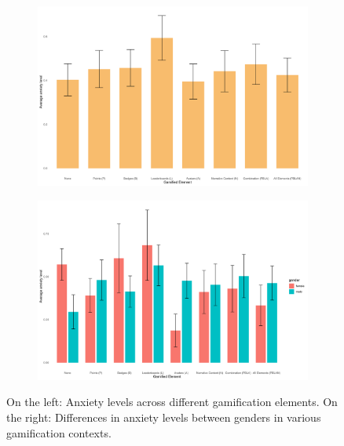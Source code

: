 \begin{figure}[h]
    \centering
    \begin{subfigure}[b]{0.45\textwidth}
        \includegraphics[width=\textwidth]{img/plots/plot_anxiety.png}
        \label{fig:plot_anxiety}
    \end{subfigure}
    \hfill
    \begin{subfigure}[b]{0.45\textwidth}
        \includegraphics[width=\textwidth]{img/plots/plot_anxiety_gender.png}
        \label{fig:plot_anxiety_gender}
    \end{subfigure}
    \caption{On the left: Anxiety levels across different gamification elements. On the right: Differences in anxiety levels between genders in various gamification contexts.}
    \label{fig:anxiety_comparison}
\end{figure}

